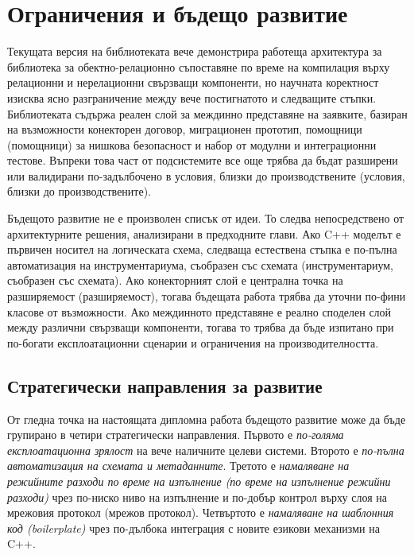 \section{Ограничения и бъдещо развитие}
\label{sec:future_work}

Текущата версия на библиотеката вече демонстрира работеща архитектура за библиотека за обектно-релационно съпоставяне по време на компилация върху релационни и нерелационни свързващи компоненти, но научната коректност изисква ясно разграничение между вече постигнатото и следващите стъпки. Библиотеката съдържа реален слой за междинно представяне на заявките, базиран на възможности конекторен договор, миграционен прототип, помощници (помощници) за нишкова безопасност и набор от модулни и интеграционни тестове. Въпреки това част от подсистемите все още трябва да бъдат разширени или валидирани по-задълбочено в условия, близки до производствените (условия, близки до производствените).

Бъдещото развитие не е произволен списък от идеи. То следва непосредствено от архитектурните решения, анализирани в предходните глави. Ако C++ моделът е първичен носител на логическата схема, следваща естествена стъпка е по-пълна автоматизация на инструментариума, съобразен със схемата (инструментариум, съобразен със схемата). Ако конекторният слой е централна точка на разширяемост (разширяемост), тогава бъдещата работа трябва да уточни по-фини класове от възможности. Ако междинното представяне е реално споделен слой между различни свързващи компоненти, тогава то трябва да бъде изпитано при по-богати експлоатационни сценарии и ограничения на производителността.

\subsection{Стратегически направления за развитие}

От гледна точка на настоящата дипломна работа бъдещото развитие може да бъде групирано в четири стратегически направления. Първото е \emph{по-голяма експлоатационна зрялост} на вече наличните целеви системи. Второто е \emph{по-пълна автоматизация на схемата и метаданните}. Третото е \emph{намаляване на режийните разходи по време на изпълнение (по време на изпълнение режийни разходи)} чрез по-ниско ниво на изпълнение и по-добър контрол върху слоя на мрежовия протокол (мрежов протокол). Четвъртото е \emph{намаляване на шаблонния код (boilerplate)} чрез по-дълбока интеграция с новите езикови механизми на C++.

